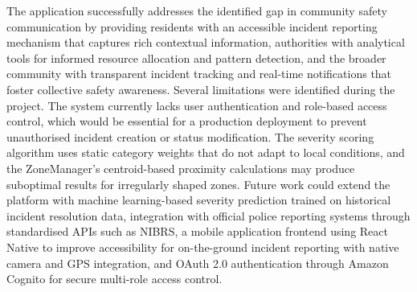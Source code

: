 \documentclass[conference]{IEEEtran}
\begin{document}
The application successfully addresses the identified gap in community safety communication by providing residents with an accessible incident reporting mechanism that captures rich contextual information, authorities with analytical tools for informed resource allocation and pattern detection, and the broader community with transparent incident tracking and real-time notifications that foster collective safety awareness. Several limitations were identified during the project. The system currently lacks user authentication and role-based access control, which would be essential for a production deployment to prevent unauthorised incident creation or status modification. The severity scoring algorithm uses static category weights that do not adapt to local conditions, and the ZoneManager's centroid-based proximity calculations may produce suboptimal results for irregularly shaped zones. Future work could extend the platform with machine learning-based severity prediction trained on historical incident resolution data, integration with official police reporting systems through standardised APIs such as NIBRS, a mobile application frontend using React Native to improve accessibility for on-the-ground incident reporting with native camera and GPS integration, and OAuth 2.0 authentication through Amazon Cognito for secure multi-role access control.
\end{document}
